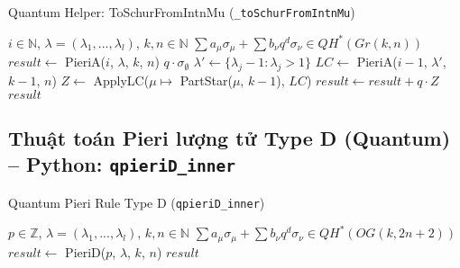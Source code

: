 \begin{algorithm}[H]
\caption{Quantum Helper: ToSchurFromIntnMu (\texttt{\_toSchurFromIntnMu})}
\begin{algorithmic}[1]
\REQUIRE $i \in \mathbb{N}$, $\lambda = (\lambda_1, ..., \lambda_l)$, $k, n \in \mathbb{N}$
\ENSURE $\sum a_\mu \sigma_\mu + \sum b_\nu q^d \sigma_\nu \in QH^*(Gr(k,n))$
\STATE $result \gets$ PieriA($i$, $\lambda$, $k$, $n$)
        \RETURN $q \cdot \sigma_{\emptyset}$
    \ENDIF
    \STATE $\lambda' \gets \{\lambda_j - 1 : \lambda_j > 1\}$
    \STATE $LC \gets$ PieriA($i-1$, $\lambda'$, $k-1$, $n$)
    \STATE $Z \gets$ ApplyLC($\mu \mapsto$ PartStar($\mu$, $k-1$), $LC$)
    \STATE $result \gets result + q \cdot Z$
\ENDIF
\RETURN $result$
\end{algorithmic}
\end{algorithm}

\subsection*{Thuật toán Pieri lượng tử Type D (Quantum) -- Python: \texttt{qpieriD\_inner}}

\begin{algorithm}[H]
\caption{Quantum Pieri Rule Type D (\texttt{qpieriD\_inner})}
\begin{algorithmic}[1]
\REQUIRE $p \in \mathbb{Z}$, $\lambda = (\lambda_1, ..., \lambda_l)$, $k, n \in \mathbb{N}$
\ENSURE $\sum a_\mu \sigma_\mu + \sum b_\nu q^d \sigma_\nu \in QH^*(OG(k,2n+2))$
\STATE $result \gets$ PieriD($p$, $\lambda$, $k$, $n$) 
\RETURN $result$ %
\end{algorithmic}
\end{algorithm}